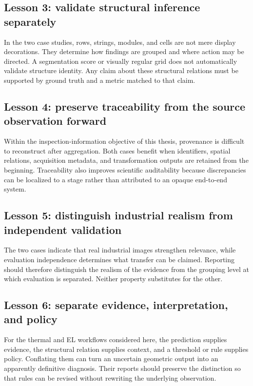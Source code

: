 \documentclass[12pt,a4paper]{report}
\begin{document}
\subsection{Lesson 3: validate structural inference separately}

In the two case studies, rows, strings, modules, and cells are not mere display decorations. They determine how findings are grouped and where action may be directed. A segmentation score or visually regular grid does not automatically validate structure identity. Any claim about these structural relations must be supported by ground truth and a metric matched to that claim.

\subsection{Lesson 4: preserve traceability from the source observation forward}

Within the inspection-information objective of this thesis, provenance is difficult to reconstruct after aggregation. Both cases benefit when identifiers, spatial relations, acquisition metadata, and transformation outputs are retained from the beginning. Traceability also improves scientific auditability because discrepancies can be localized to a stage rather than attributed to an opaque end-to-end system.

\subsection{Lesson 5: distinguish industrial realism from independent validation}

The two cases indicate that real industrial images strengthen relevance, while evaluation independence determines what transfer can be claimed. Reporting should therefore distinguish the realism of the evidence from the grouping level at which evaluation is separated. Neither property substitutes for the other.

\subsection{Lesson 6: separate evidence, interpretation, and policy}

For the thermal and EL workflows considered here, the prediction supplies evidence, the structural relation supplies context, and a threshold or rule supplies policy. Conflating them can turn an uncertain geometric output into an apparently definitive diagnosis. Their reports should preserve the distinction so that rules can be revised without rewriting the underlying observation.
\end{document}
